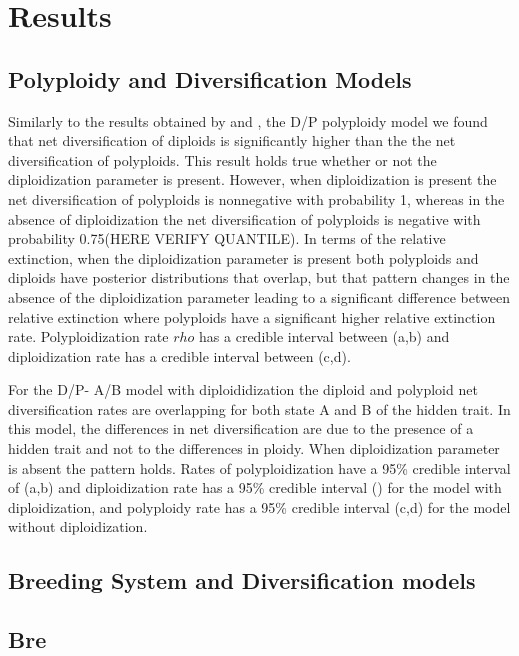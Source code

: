 \section{Results}
\subsection{Polyploidy and Diversification Models}
Similarly to the results obtained by \citet{mayrose_2011} and \citet{mayrose_2015}, the D/P polyploidy  model we found that net diversification of diploids is significantly higher than the the net diversification of polyploids. This result holds true whether or not the diploidization parameter is present. However, when diploidization is present the net diversification of polyploids is nonnegative with probability 1, whereas in the absence of diploidization the net diversification of polyploids is negative with probability 0.75(HERE VERIFY QUANTILE). In terms of the relative extinction, when the diploidization parameter is present both polyploids and diploids have posterior distributions that overlap, but that pattern changes in the absence of the diploidization parameter leading to a significant difference between relative extinction where polyploids have a significant higher relative extinction rate. Polyploidization rate $rho$ has a credible interval between (a,b) and diploidization rate has a credible interval between (c,d).

For the D/P- A/B model with diploididization the diploid and polyploid net diversification rates are overlapping for both state A and B of the hidden trait. In this model, the differences in net diversification are due to the presence of a hidden trait and not to the differences in ploidy. When diploidization parameter is absent the pattern holds. Rates of polyploidization have a 95\% credible interval of (a,b) and diploidization rate has a 95\% credible interval ()  for the model with diploidization, and polyploidy rate has a 95\% credible interval (c,d) for the model without diploidization.

\subsection{Breeding System and Diversification models }


\subsection{Bre}




